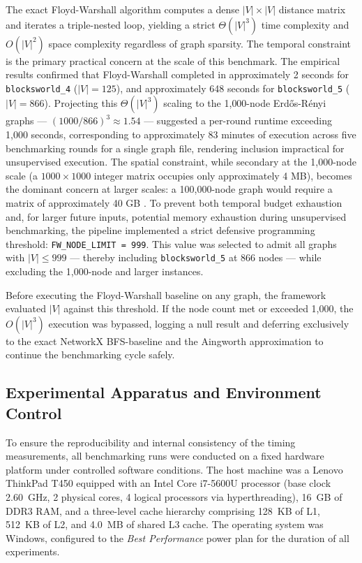 The exact Floyd-Warshall algorithm computes a dense $|V| \times |V|$ distance matrix and iterates a triple-nested loop, yielding a strict $\Theta(|V|^3)$ time complexity and $O(|V|^2)$ space complexity regardless of graph sparsity. The temporal constraint is the primary practical concern at the scale of this benchmark. The empirical results confirmed that Floyd-Warshall completed in approximately 2 seconds for \texttt{blocksworld\_4} ($|V| = 125$), and approximately 648 seconds for \texttt{blocksworld\_5} ($|V| = 866$). Projecting this $\Theta(|V|^3)$ scaling to the 1{,}000-node Erdős-Rényi graphs --- $(1000 / 866)^3 \approx 1.54$ --- suggested a per-round runtime exceeding 1{,}000 seconds, corresponding to approximately 83 minutes of execution across five benchmarking rounds for a single graph file, rendering inclusion impractical for unsupervised execution. The spatial constraint, while secondary at the 1{,}000-node scale (a $1000 \times 1000$ integer matrix occupies only approximately 4 MB), becomes the dominant concern at larger scales: a 100{,}000-node graph would require a matrix of approximately 40 GB \cite{aingworth96}. To prevent both temporal budget exhaustion and, for larger future inputs, potential memory exhaustion during unsupervised benchmarking, the pipeline implemented a strict defensive programming threshold: \texttt{FW\_NODE\_LIMIT = 999}. This value was selected to admit all graphs with $|V| \leq 999$ --- thereby including \texttt{blocksworld\_5} at 866 nodes --- while excluding the 1{,}000-node and larger instances.
 
Before executing the Floyd-Warshall baseline on any graph, the framework evaluated $|V|$ against this threshold. If the node count met or exceeded 1{,}000, the $O(|V|^3)$ execution was bypassed, logging a null result and deferring exclusively to the exact NetworkX BFS-baseline and the Aingworth approximation to continue the benchmarking cycle safely.

\subsection{Experimental Apparatus and Environment Control}
\label{subsec:apparatus}

To ensure the reproducibility and internal consistency of the timing measurements, all benchmarking runs were conducted on a fixed hardware platform under controlled software conditions. The host machine was a Lenovo ThinkPad T450 equipped with an Intel Core i7-5600U processor (base clock 2.60~GHz, 2 physical cores, 4 logical processors via hyperthreading), 16~GB of DDR3 RAM, and a three-level cache hierarchy comprising 128~KB of L1, 512~KB of L2, and 4.0~MB of shared L3 cache. The operating system was Windows, configured to the \textit{Best Performance} power plan for the duration of all experiments.

